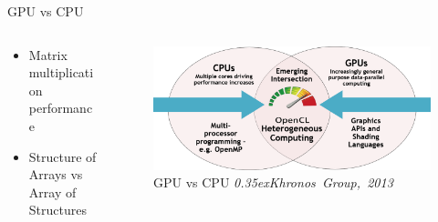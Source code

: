 \documentclass[10pt,aspectratio=169]{beamer} %
\begin{document}
\begin{frame}{GPU vs CPU}

\begin{columns}[c]
\begin{column}{0.4\textwidth}
\begin{itemize}[<+- | alert@+>]
\item Matrix multiplication performance
\item Structure of Arrays vs Array of Structures
\end{itemize}
\end{column}%
\begin{column}{0.6\textwidth}
\begin{figure}
    \includegraphics[width=\textwidth]{gpucpu.png}
    \caption{GPU vs CPU \emph{\textcopyright \scriptsize\raise0.35ex\hbox{Khronos Group, 2013}}}
\end{figure}
\end{column}
\end{columns}
\end{frame}
	
\end{document}
